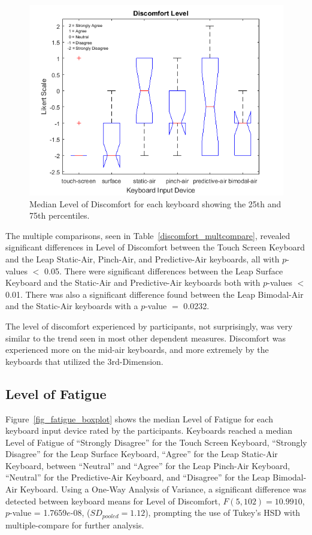 \begin{figure}[h]
	\centering
	\includegraphics{fig_discomfort_boxplot}
	\caption[Level of Discomfort Boxplot]{Median Level of Discomfort for each keyboard showing the 25th and 75th percentiles.}
	\label{fig_discomfort_boxplot}
\end{figure}

The multiple comparisons, seen in Table~\ref{discomfort_multcompare}, revealed significant differences in Level of Discomfort between the Touch Screen Keyboard and the Leap Static-Air, Pinch-Air, and Predictive-Air keyboards, all with $p$-values $<$ 0.05. There were significant differences between the Leap Surface Keyboard and the Static-Air and Predictive-Air keyboards both with $p$-values $<$ 0.01. There was also a significant difference found between the Leap Bimodal-Air and the Static-Air keyboards with a $p$-value $=$ 0.0232.

The level of discomfort experienced by participants, not surprisingly, was very similar to the trend seen in most other dependent measures. Discomfort was experienced more on the mid-air keyboards, and more extremely by the keyboards that utilized the 3rd-Dimension.

\subsection{Level of Fatigue}
Figure~\ref{fig_fatigue_boxplot} shows the median Level of Fatigue for each keyboard input device rated by the participants. Keyboards reached a median Level of Fatigue of ``Strongly Disagree'' for the Touch Screen Keyboard, ``Strongly Disagree'' for the Leap Surface Keyboard, ``Agree'' for the Leap Static-Air Keyboard, between ``Neutral'' and ``Agree'' for the Leap Pinch-Air Keyboard, ``Neutral'' for the Predictive-Air Keyboard, and ``Disagree'' for the Leap Bimodal-Air Keyboard. Using a One-Way Analysis of Variance, a significant difference was detected between keyboard means for Level of Discomfort, $F(5, 102) = 10.9910$, $p$-value = 1.7659$e$-08, ($SD_{pooled} = 1.12$), prompting the use of Tukey's HSD with multiple-compare for further analysis.

